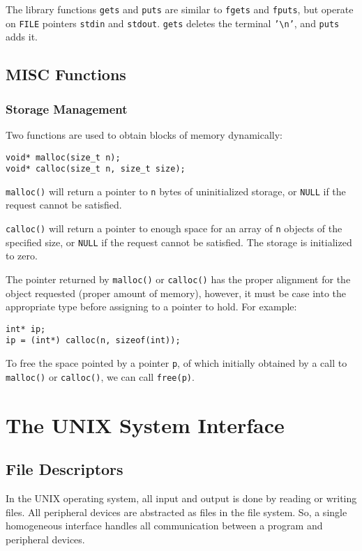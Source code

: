 \documentclass[12pt]{article}
\begin{document}
The library functions \texttt{gets} and \texttt{puts} are similar to \texttt{fgets} and \texttt{fputs}, but operate on \texttt{FILE} pointers \texttt{stdin} and \texttt{stdout}. \texttt{gets} deletes the terminal \texttt{'\textbackslash{}n'}, and \texttt{puts} adds it.
\subsection{MISC Functions}
\label{sec:org7fb2baa}
\subsubsection{Storage Management}
\label{sec:orgc47ab9d}
Two functions are used to obtain blocks of memory dynamically:
\begin{verbatim}
void* malloc(size_t n);
void* calloc(size_t n, size_t size);
\end{verbatim}

\texttt{malloc()} will return a pointer to \texttt{n} bytes of uninitialized storage, or \texttt{NULL} if the request cannot be satisfied.

\texttt{calloc()} will return a pointer to enough space for an array of \texttt{n} objects of the specified size, or \texttt{NULL} if the request cannot be satisfied. The storage is initialized to zero.

The pointer returned by \texttt{malloc()} or \texttt{calloc()} has the proper alignment for the object requested (proper amount of memory), however, it must be case into the appropriate type before assigning to a pointer to hold. For example:
\begin{verbatim}
int* ip;
ip = (int*) calloc(n, sizeof(int));
\end{verbatim}

To free the space pointed by a pointer \texttt{p}, of which initially obtained by a call to \texttt{malloc()} or \texttt{calloc()}, we can call \texttt{free(p)}.
\section{The UNIX System Interface}
\label{sec:orgf6ee576}
\subsection{File Descriptors}
\label{sec:org41ae319}
In the UNIX operating system, all input and output is done by reading or writing files. All peripheral devices are abstracted as files in the file system. So, a single homogeneous interface handles all communication between a program and peripheral devices.
\end{document}
